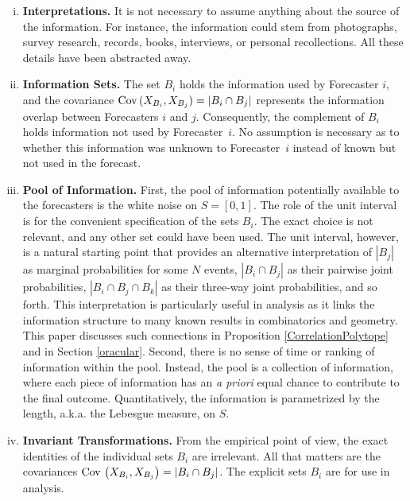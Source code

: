 \documentclass[11pt]{article}
\theoremstyle{definition}
\theoremstyle{definition}
\def\Cov{{\rm Cov}\,}
\begin{document}
\begin{enumerate}[(i)]
\item {\bf Interpretations.} It is not necessary to assume anything 
about the source of the information.  For instance, the information 
could stem from photographs, survey research, records, books, 
interviews, or personal recollections.  All these details have 
been abstracted away.

\item {\bf Information Sets.} The set $B_i$ holds the information used
by Forecaster $i$, and the covariance $\Cov (X_{B_i} , X_{B_j}) = |B_{i} \cap B_{j}|$
represents the information overlap between Forecasters $i$ and
$j$.
Consequently, the complement of $B_i$ holds information not used by
Forecaster~$i$.  No assumption is necessary as to whether this
information was unknown to Forecaster~$i$ instead of known but not
used in the forecast.


\item {\bf Pool of Information.} First, the pool of
information potentially available to the forecasters is the white
noise on $S = [0,1]$. The role of the unit interval
is for the convenient specification of the sets $B_i$.
The exact choice is not relevant, and
any other set could have been used. The unit interval, however, is a
natural starting point that provides an alternative interpretation of $|B_j|$ as marginal probabilities for some $N$ events, $|B_i \cap B_j|$ as their pairwise joint probabilities, $|B_i \cap B_j
\cap B_k|$ as their three-way joint probabilities,
and so forth.  This interpretation is particularly useful in analysis as it links the
information structure to many known results in combinatorics and geometry. This paper discusses such connections in Proposition \ref{CorrelationPolytope} and in Section \ref{oracular}. Second, there is
no sense of time or ranking of information within the
pool. Instead, the pool is a collection of information, where each
piece of information has an {\em a priori} equal chance to contribute
to the final outcome.  Quantitatively, the information is parametrized
by the length, a.k.a. the Lebesgue measure, on $S$.
\label{item:pool}


\item {\bf Invariant Transformations.}  From the empirical point of
view, the exact identities of the individual sets $B_i$ are
irrelevant.  All that matters are the covariances $\Cov \left(X_{B_i}
, X_{B_j}\right) = |B_i \cap B_j|$.  The explicit sets $B_i$ are for
use in analysis.


\end{enumerate}
\end{document}
